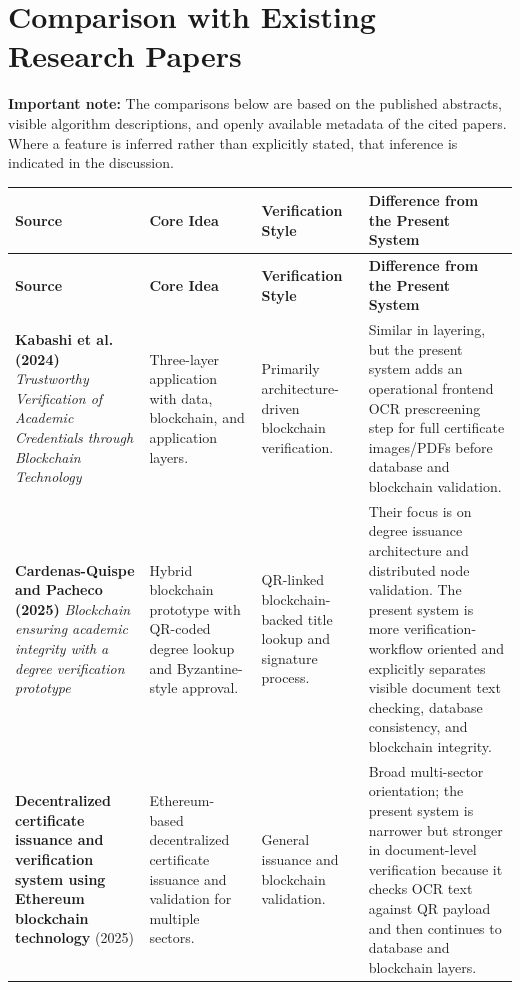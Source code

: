 \documentclass[12pt,a4paper]{article}
\begin{document}
\section{Comparison with Existing Research Papers}
\textbf{Important note:} The comparisons below are based on the published abstracts, visible algorithm descriptions, and openly available metadata of the cited papers. Where a feature is inferred rather than explicitly stated, that inference is indicated in the discussion.

\begin{longtable}{p{3.2cm}p{3.4cm}p{3.2cm}p{4.8cm}}
\toprule
\textbf{Source} & \textbf{Core Idea} & \textbf{Verification Style} & \textbf{Difference from the Present System} \\
\midrule
\endfirsthead
\toprule
\textbf{Source} & \textbf{Core Idea} & \textbf{Verification Style} & \textbf{Difference from the Present System} \\
\midrule
\endhead
\textbf{Kabashi et al. (2024)} \newline \emph{Trustworthy Verification of Academic Credentials through Blockchain Technology} & Three-layer application with data, blockchain, and application layers. & Primarily architecture-driven blockchain verification. & Similar in layering, but the present system adds an operational frontend OCR prescreening step for full certificate images/PDFs before database and blockchain validation. \\

\textbf{Cardenas-Quispe and Pacheco (2025)} \newline \emph{Blockchain ensuring academic integrity with a degree verification prototype} & Hybrid blockchain prototype with QR-coded degree lookup and Byzantine-style approval. & QR-linked blockchain-backed title lookup and signature process. & Their focus is on degree issuance architecture and distributed node validation. The present system is more verification-workflow oriented and explicitly separates visible document text checking, database consistency, and blockchain integrity. \\

\textbf{Decentralized certificate issuance and verification system using Ethereum blockchain technology} (2025) & Ethereum-based decentralized certificate issuance and validation for multiple sectors. & General issuance and blockchain validation. & Broad multi-sector orientation; the present system is narrower but stronger in document-level verification because it checks OCR text against QR payload and then continues to database and blockchain layers. \\


\end{longtable}
\end{document}
